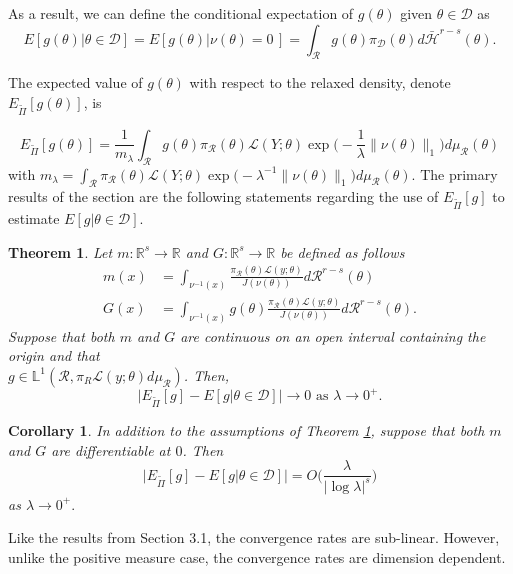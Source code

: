 \documentclass[10pt,fleqn]{article} \pdfoutput=1
\newtheorem{theorem}{Theorem} \newtheorem{lemma}{Lemma}
\newtheorem{corollary}{Corollary} \newtheorem{remark}{Remark}
\DeclareMathOperator{\1}{\mathbbm{1}} \DeclareMathOperator{\bigO}{\mc O}
\begin{document}
 As a result, we
can define the conditional  expectation of $g(\theta)$ given $\theta \in
	\mathcal{D}$ as $$E[g(\theta) | \theta\in\mathcal{D}] = E[g(\theta) |
			\nu(\theta) =0\,] = \int_\mathcal{R} g(\theta) \pi_\mathcal{D}(\theta)
	d\bar{\mathcal{H}}^{r-s}(\theta).$$

The expected value of
$g(\theta)$ with respect to the relaxed density, denote
$E_{\tilde{\Pi}}[g(\theta)] $, is

$$		E_{\tilde{\Pi}}[g(\theta)] = \frac{1}{m_\lambda}
		\int_\mathcal{R} g(\theta) \pi_\mathcal{R}(\theta)
		\mathcal{L}(Y;\theta)\exp\bigg(-\frac{1}{\lambda}\|\nu (\theta)\|_1\bigg)
		d\mu_\mathcal{R}(\theta) $$
		with $m_\lambda =
	\int_\mathcal{R}  \pi_\mathcal{R}(\theta)
	\mathcal{L}(Y;\theta)\exp\bigg(-{\lambda^{-1}}\|\nu (\theta)\|_1\bigg)
	d\mu_\mathcal{R}(\theta).$
The primary results of the section are the following statements regarding
the use of $E_{\tilde{\Pi}}[g]$ to estimate $E[g|\theta\in\mathcal{D}]$.

\begin{theorem} \label{THM:Relaxed_Expectation_Convergence_Measure_Zero}
	Let $m:\mathbb{R}^s\to \mathbb{R}$ and $G:\mathbb{R}^s\to
		\mathbb{R}$ be defined as follows \begin{align*} m(x) & =
		\int_{\nu^{-1}(x)} \frac{\pi_\mathcal{R}(\theta)
			\mathcal{L}(y;\theta)}{J(\nu(\theta))}
		d\mathcal{R}^{r-s}(\theta) \\ G(x) &= \int_{\nu^{-1}(x)}
		g(\theta)\frac{\pi_\mathcal{R}(\theta)
			\mathcal{L}(y;\theta)}{J(\nu(\theta))} d\mathcal{R}^{r-s}(\theta).
	\end{align*} Suppose that both $m$ and $G$ are continuous on an open
	interval containing the origin and that \\
	$g\in\mathbb{L}^1(\mathcal{R},\pi_R\mathcal{L}(y;\theta)d\mu_\mathcal{R})$.
	Then, $$\bigg|E_{\tilde{\Pi}}[g] - E[g|\theta \in \mathcal{D}]\bigg| \to 0
		\text{ as } \lambda\to 0^+.$$ \end{theorem}

\begin{corollary} In addition to the assumptions of Theorem
	\ref{THM:Relaxed_Expectation_Convergence_Measure_Zero}, suppose
	that both $m$ and $G$ are differentiable at $0$. Then
	$$\bigg|E_{\tilde{\Pi}}[g] - E[g|\theta \in \mathcal{D}] \bigg| =
		O\bigg(\frac{\lambda}{|\log \lambda|^s}\bigg)$$ as $\lambda \to
		0^+.$ \end{corollary}

Like the results from Section 3.1, the convergence rates are sub-linear.
However, unlike the positive measure case, the convergence rates are
dimension dependent.
\end{document}
